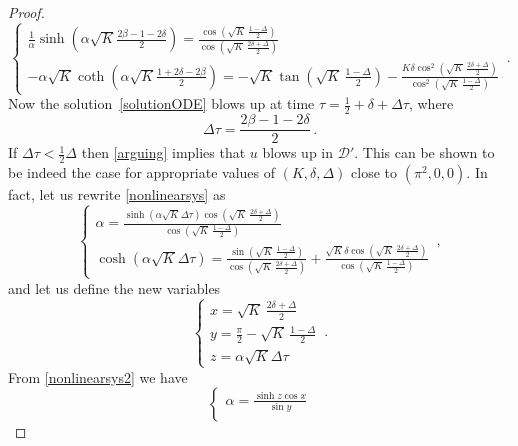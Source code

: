 \documentclass[10pt]{amsart}
\begin{document}
\begin{proof}
\begin{equation}
\begin{cases}
\frac1{\alpha}\sinh \left( \alpha\sqrt{K} \frac{2\beta - 1 - 2 \delta}2 \right) = \frac{\cos \left( \sqrt{K} \, \frac{1 - \Delta}2 \right)}{\cos \left( \sqrt{K} \, \frac{2\delta + \Delta}2 \right)} \\
- \alpha \sqrt{K} \coth \left( \alpha\sqrt{K} \frac{1 + 2 \delta - 2\beta}2 \right) = - \sqrt{K} \tan \left( \sqrt{K} \, \frac{1 - \Delta}2 \right) - \frac{K \delta\cos^2 \left( \sqrt{K} \, \frac{2\delta + \Delta}2 \right)}{\cos^2 \left( \sqrt{K} \, \frac{1 - \Delta}2 \right)}
\end{cases} \, .
\end{equation}
Now the solution~\eqref{solutionODE} blows up at time $\tau = \frac12 + \delta + \Delta\tau$, where
\begin{equation}
\Delta\tau = \frac{2\beta - 1 - 2 \delta}2 \, .
\end{equation}
If $\Delta \tau < \frac12 \Delta$ then \eqref{arguing} implies that $u$ blows up in $\mathcal{D}'$. This can be shown to be indeed the case for appropriate values of $(K, \delta, \Delta)$ close to $(\pi^2,0,0)$. In fact, let us rewrite \eqref{nonlinearsys} as
\begin{equation} \label{nonlinearsys2}
\begin{cases} 
\alpha = \frac{\sinh\left( \alpha\sqrt{K} \Delta \tau \right) \cos \left( \sqrt{K} \, \frac{2\delta + \Delta}2 \right)}{\cos \left( \sqrt{K} \, \frac{1 - \Delta}2 \right)} \\
\cosh\left( \alpha\sqrt{K} \Delta \tau \right) = \frac{\sin \left( \sqrt{K} \, \frac{1 - \Delta}2 \right)}{\cos \left( \sqrt{K} \, \frac{2\delta + \Delta}2 \right)} + \frac{\sqrt{K} \delta\cos \left( \sqrt{K} \, \frac{2\delta + \Delta}2 \right)}{\cos \left( \sqrt{K} \, \frac{1 - \Delta}2 \right)}
\end{cases} \, ,
\end{equation}
and let us define the new variables
\begin{equation}
\begin{cases}
x = \sqrt{K} \, \frac{2\delta + \Delta}2 \\
y = \frac{\pi}2 - \sqrt{K} \, \frac{1 - \Delta}2 \\
z = \alpha\sqrt{K} \Delta\tau
\end{cases} \, .
\end{equation}
From \eqref{nonlinearsys2} we have
\begin{equation} \label{nonlinearsysxyz}
\begin{cases}
\alpha = \frac{\sinh z \cos x}{\sin y} \\

\end{cases}
\end{equation}
\end{proof}
\end{document}
